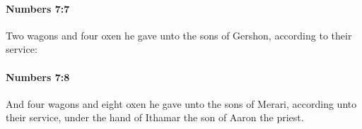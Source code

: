 		\paragraph{Numbers 7:7} %
			\label{NUMBERS-7-7}

			Two wagons and four oxen he gave unto the sons of Gershon, according to their service:


		\paragraph{Numbers 7:8} %
			\label{NUMBERS-7-8}

			And four wagons and eight oxen he gave unto the sons of Merari, according unto their service, under the hand of Ithamar the son of Aaron the priest.


